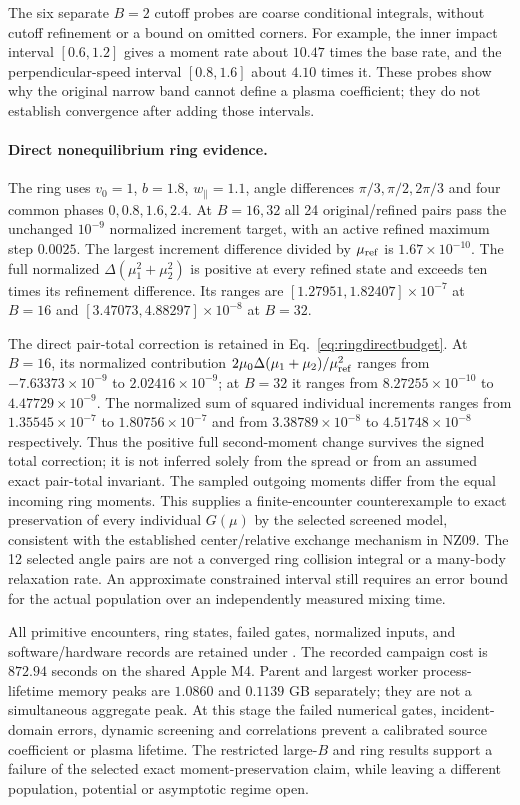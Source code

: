 \documentclass[11pt,letterpaper]{article}
\begin{document}
The six separate $B=2$ cutoff probes are coarse conditional integrals,
without cutoff refinement or a bound on omitted corners. For example,
the inner impact interval $[0.6,1.2]$ gives a moment rate about $10.47$
times the base rate, and the perpendicular-speed interval $[0.8,1.6]$
about $4.10$ times it. These probes show why the original narrow band
cannot define a plasma coefficient; they do not establish convergence
after adding those intervals.

\paragraph{Direct nonequilibrium ring evidence.}
The ring uses $v_0=1$, $b=1.8$, $w_\parallel=1.1$, angle differences
$\pi/3,\pi/2,2\pi/3$ and four common phases $0,0.8,1.6,2.4$.
At $B=16,32$ all 24 original/refined pairs pass the unchanged
$10^{-9}$ normalized increment target, with an active refined maximum
step $0.0025$. The largest increment difference divided by
$\mu_{\rm ref}$ is $1.67\times10^{-10}$. The full normalized
$\Delta(\mu_1^2+\mu_2^2)$ is positive at every refined state and
exceeds ten times its refinement difference. Its ranges are
$[1.27951,1.82407]\times10^{-7}$ at $B=16$ and
$[3.47073,4.88297]\times10^{-8}$ at $B=32$.

The direct pair-total correction is retained in
Eq.~\eqref{eq:ringdirectbudget}. At $B=16$, its normalized contribution
$2\mu_0\Delta(\mu_1+\mu_2)/\mu_{\rm ref}^2$ ranges from
$-7.63373\times10^{-9}$ to $2.02416\times10^{-9}$; at $B=32$
it ranges from $8.27255\times10^{-10}$ to $4.47729\times10^{-9}$.
The normalized sum of squared individual increments ranges from
$1.35545\times10^{-7}$ to $1.80756\times10^{-7}$ and from
$3.38789\times10^{-8}$ to $4.51748\times10^{-8}$ respectively.
Thus the positive full second-moment change survives the signed total
correction; it is not inferred solely from the spread or from an assumed
exact pair-total invariant. The sampled outgoing moments differ from
the equal incoming ring moments. This supplies a finite-encounter
counterexample to exact preservation of every individual $G(\mu)$ by
the selected screened model, consistent with the established
center/relative exchange mechanism in NZ09. The 12 selected angle pairs
are not a converged ring collision integral or a many-body relaxation
rate. An approximate constrained interval still requires an error bound
for the actual population over an independently measured mixing time.

All primitive encounters, ring states, failed gates, normalized inputs,
and software/hardware records are retained under
. The recorded campaign cost is
$872.94$ seconds on the shared Apple M4. Parent and largest worker
process-lifetime memory peaks are $1.0860$ and $0.1139$ GB separately;
they are not a simultaneous aggregate peak. At this stage the failed
numerical gates, incident-domain errors, dynamic screening and correlations prevent
a calibrated source coefficient or plasma lifetime. The restricted
large-$B$ and ring results support a failure of the selected exact
moment-preservation claim, while leaving a different population, potential
or asymptotic regime open.
\end{document}
